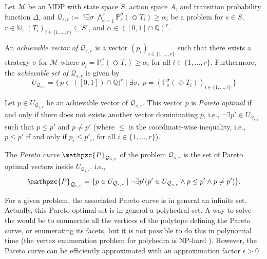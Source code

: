 Let $\mathcal{M}$ be an MDP with state space $S$, action space $A$, and transition probability function $\Delta$, and
$
  \mathcal{Q}_{s, r} := \,?\exists \sigma\; \bigwedge_{i=1}^r \mathbb{P}^\sigma_s(\Diamond T_i) \geq \alpha_i
$
be a \MOSR{} problem for $s \in S$, $r \in \mathbb{N}$, $(T_i)_{i \in \{1, \dots, r\}} \subseteq S^r$, and $\alpha \in ([0, 1] \cap \mathbb{Q})^r$.

\begin{definition}
An \textit{achievable vector of $\mathcal{Q}_{s, r}$} is a vector $(p_i)_{i \in \{1, \dots, r\}}$ such that there exists a strategy $\sigma$ for $\mathcal{M}$ where $p_i = \mathbb{P}^\sigma_s(\Diamond T_i) \geq \alpha_i$ for all $i \in \{1, \dots, r\}$.
Furthermore, the \textit{achievable set of $\mathcal{Q}_{s, r}$} is given by
\[U_{\mathcal{Q}_{s, r}} = \{ \, p \in ([0, 1]) \cap \mathbb{Q})^r \; | \; \exists \sigma, \; p = (\mathbb{P}_s^\sigma (\Diamond T_i))_{i \in \{1, \dots, r\}} \, \}\]
\end{definition}

\begin{definition}
  Let $p \in U_{\mathcal{Q}_{s, r}}$ be an achievable vector of $\mathcal{Q}_{s, r}$.
  This vector $p$ is \textit{Pareto optimal} if and only if there does not exists another vector domininating $p$, i.e., $\neg \exists p' \in U_{\mathcal{Q}_{s, r}}$ such that $p \leq p'$ and $p \neq p'$
  (where $\leq$ is the coordinate-wise inequality, i.e., $p\leq p'$ if and only if $p_i \leq p'_i$, for all $i \in \{1, \dots, r\}$).
\end{definition}

\begin{definition}
  The \textit{Pareto curve} $\mathpzc{P}_{\mathcal{Q}_{s, r}}$
  of the \MOSR{} problem $\mathcal{Q}_{s, r}$ is the set of Pareto optimal vectors inside $U_{\mathcal{Q}_{s, r}}$, i.e.,
  \[
    \mathpzc{P}_{\mathcal{Q}_{s, r}} =
    \{ p \in U_{\mathcal{Q}_{s, r}} \; | \;
    \neg \exists p'(p' \in U_{\mathcal{Q}_{s, r}} \wedge p \leq p' \wedge p \neq p')\}.
  \]
\end{definition}
For a given \MOSR{} problem, the associated Pareto curve is in general an infinite set.
Actually, this Pareto optimal set is in general a polyhedral set. %
A way to solve the \MOSR{} would be to enumerate all the vertices of the polytope defining the Pareto curve, or enumerating its facets, but it is not possible to do this in polynomial time (the vertex enumeration problem for polyhedra is NP-hard \cite{Boros09generatingvertices}).
However, the Pareto curve can be efficiently approximated with an approximation factor $\epsilon > 0$ \cite{DBLP:conf/focs/PapadimitriouY00}.

